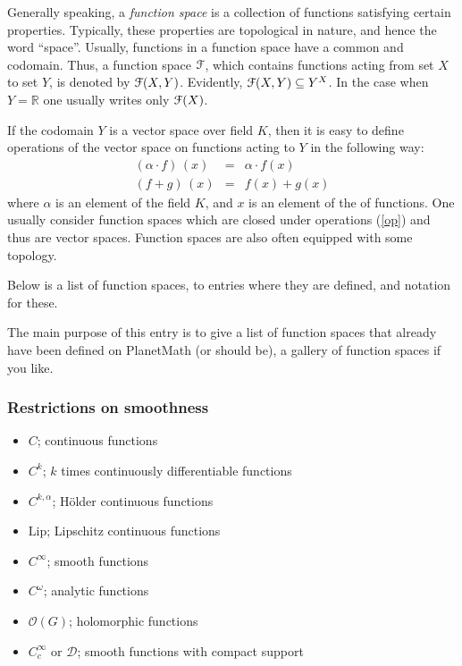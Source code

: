 \documentclass[12pt]{article}
\begin{document}
Generally speaking, a \textit{function space} is a collection of functions satisfying certain properties.  Typically, these properties are topological in nature, and hence the word ``space''.  Usually, functions in a function space have a common  and codomain.  Thus, a function space $\EuScript{F}$, which contains functions acting from set $X$ to set $Y$, is denoted by $\EuScript{F}(X,Y)$.  Evidently, $\EuScript{F}(X,Y)\subseteq Y^X$.  In the case when $Y=\mathbb{R}$ one usually writes only $\EuScript{F}(X)$.

If the codomain $Y$ is a vector space over field $K$, then it is easy to define
operations of the vector space on functions acting to $Y$ in the following way:
\begin{equation}
    \begin{array}{rcl}
        (\alpha\cdot f)\, (x) & = & \alpha\cdot f(x) \\
        (f+g)\,(x) & = & f(x)+g(x)
    \end{array}
\label{op}
\end{equation}
where $\alpha$ is an element of the field $K$, and $x$ is an element of the  of functions.
One usually consider function spaces which are closed under operations (\ref{op}) and thus
are vector spaces. Function spaces are also often equipped with some topology.

Below is a list of function spaces,  to entries where they are defined, and notation for these.

The main purpose of this entry is to give a list
of function spaces that already have been 
defined on PlanetMath (or should be), a gallery of function
spaces if you like. 

\subsubsection*{Restrictions on smoothness}
\begin{itemize}
\item $C$; continuous functions
\item $C^k$; $k$ times continuously differentiable functions
\item $C^{k,\alpha}$; H\"older continuous functions
\item $\mathrm{Lip}$; Lipschitz continuous functions
\item $C^\infty$; smooth functions
\item $C^\omega$; analytic functions
\item $\mathcal{O}(G)$; holomorphic functions
\item $C_c^\infty$ or $\mathcal{D}$; smooth functions with compact support 
\end{itemize}
\end{document}
